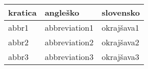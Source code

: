 %
%

\begin{table}
    \centering
    \begin{tabular}{l|ll}
        \textbf{kratica} & \textbf{angleško} & \textbf{slovensko} \\ \hline
        abbr1            & abbreviation1     & okrajšava1         \\
        abbr2            & abbreviation2     & okrajšava2         \\
        abbr3            & abbreviation3     & okrajšava3         \\
    \end{tabular}
\end{table}

